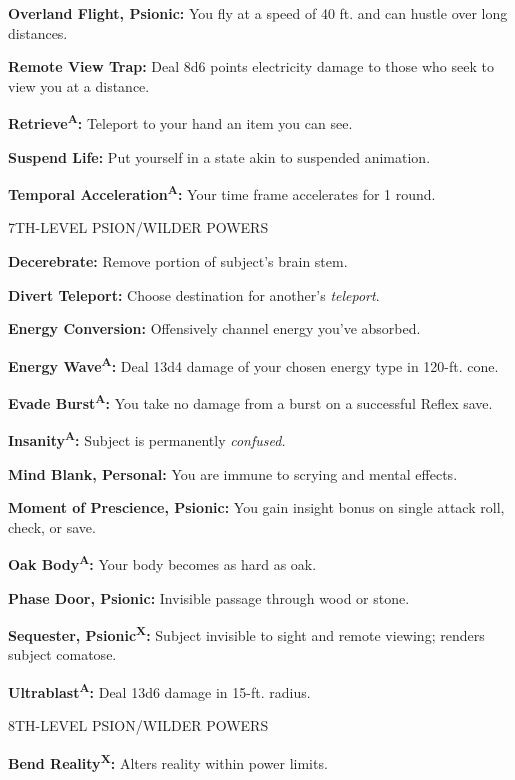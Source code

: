 \documentclass{article}
\begin{document}
\textbf{Overland Flight, Psionic: }You fly at a speed of 40 ft. and can hustle 
over long distances.

\textbf{Remote View Trap: }Deal 8d6 points electricity damage to those who seek 
to view you at a distance.

\textbf{Retrieve}\textsuperscript{\textbf{A}}\textbf{: }Teleport to your hand an 
item you can see.

\textbf{Suspend Life: }Put yourself in a state akin to suspended animation.

\textbf{Temporal Acceleration}\textsuperscript{\textbf{A}}\textbf{: }Your time 
frame accelerates for 1 round.

7TH-LEVEL PSION/WILDER POWERS

\textbf{Decerebrate: }Remove portion of subject's brain stem.

\textbf{Divert Teleport: }Choose destination for another's \textit{teleport}.

\textbf{Energy Conversion: }Offensively channel energy you've absorbed.

\textbf{Energy Wave}\textsuperscript{\textbf{A}}\textbf{: }Deal 13d4 damage of 
your chosen energy type in 120-ft. cone.

\textbf{Evade Burst}\textsuperscript{\textbf{A}}\textbf{: }You take no damage from 
a burst on a successful Reflex save.

\textbf{Insanity}\textsuperscript{\textbf{A}}\textbf{: }Subject is permanently 
\textit{confused.}

\textbf{Mind Blank, Personal: }You are immune to scrying and mental effects.

\textbf{Moment of Prescience, Psionic: }You gain insight bonus on single attack 
roll, check, or save.

\textbf{Oak Body}\textsuperscript{\textbf{A}}\textbf{: }Your body becomes as hard 
as oak.

\textbf{Phase Door, Psionic: }Invisible passage through wood or stone.

\textbf{Sequester, Psionic}\textsuperscript{\textbf{X}}\textbf{: }Subject invisible 
to sight and remote viewing; renders subject comatose.

\textbf{Ultrablast}\textsuperscript{\textbf{A}}\textbf{: }Deal 13d6 damage in 15-ft. 
radius.

8TH-LEVEL PSION/WILDER POWERS

\textbf{Bend Reality}\textsuperscript{\textbf{X}}\textbf{: }Alters reality within 
power limits.
\end{document}
